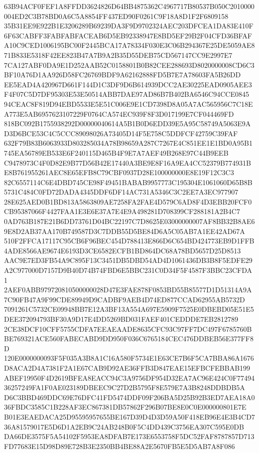 \documentclass[UTF8,fontset=fandol,zihao=-4,a4paper]{ctexart}
\begin{document}
{{63B94ACF0FEF1A8FFDD3624826D64BB4875362C4967717B80537B050C2010000004ED2C3B78BD0A6C5A8854FF437ED90F0261C9F18A8D1F2F6809158
35B31EE9E922B1E3206289B69239DA3F9D9702324AEC203DFCEA1DA83E410F6F63CABFF3FABFABFACEAB6D5EB92338947E8BD5EF29B2F04CFD36BFAF
A10C9CED1006195BC00F2445BCA17A78334F030E3C06B294367E25DE5059AE871B833E5318F42EE823B47A7B9A2B35D55DEB75CD567147CC9E2997E7
7CA127ABF0DA9E1D252AAB52C0158801B0B82CEE288693D8020000008CD6C3BF10A76D1AA926D58FC26769BDF9A62162888FD5B7E7A78603FA5B26DD
EE5EAD4A420967D661F144D1C3DF9D6B614939DCC2AE30225EAD0905AEE3F4F07C5D7DF95303E53E50514ABB7DAE97AD86B7B402BA6546C94CCE0845
94CEAC8F819D94EBD5533E5E51C006E9E1CD7398D8A05A7AC565956C7C18EA773E5AB6957623107229F0764CA574EC939F8F3D017199E7CF044469FD
818BC092B1755938292D00000040614A5B1B0D6EDD39E5A95C58749A5063E9AD3D6BCE53C4C5CCC89098026A73405D14F5E758C5DDFCF42759C39FAF
632F79B83B6063933D803285034A78B98659A287C7267E4C851EE1E1BD0A95B1745EA56789EB533E6F240115D465B4F9E7A7AEF49B268E97C44B9EEB
C9478973C4F0D82E9B77D56B42E17440A3BE9E8F16A9EA4CC52379B774931BE8B761955261AEC8E65EFB8C79CBF0937D28E100000000E8E19F12C3C3
82C6557114C6E4DBD745CE98F49451BABAB9957773C195304E1061060D65B8B5731C484C0FD72DADA4345DDF6DF14AC731A5346C3C2EE7A3EC977907
28E625AED0B1BD813A5863809AE7258FA2FAE4D579C6AD8F4D3EBB20FCF0CB95387066F4427FAA1E3E6E37A7E4E9A498281D708399CF288181A2B4C7
0AD763B187E21B6DD73761D04BC22197C7D8625E03000000007AF8BB32B8AE69E8D2AB37AA170B749587D3C7DDB55D5BE84D6A5C05AB7A1EE42AD67A
510F2FFCA17117C95CB6F96BEC454D788413E866D6C654BD424773EB9D1FFB4ADE8566AE9674E6193D3CE6582ECFB1BD864DC68A78BD5657D25D8513
AAC9E7ED3FB54A9C895F13C3451DB5DBD54AD4D1061436DB3B8F5EDFE29A2C977000D7157D9B40D74B74FBD6E5BBC231C0D34F5F4587F3BBC23CFDA1
2AEF0ABB979720810500000028D47E3FAE878F0853BD55B85577D1D51314A9A7C90FB47A9F99CDE89949D9CADBF9AEB4D74ED877CCAD62955AB5732D
7091261C5732CE09948BB7E12A3BF13A554A697E5909F7525E0DBEBD05E51E5DEE372094793BF30A9D17E4DD5269BD031FAEF401CEDDDE7EB2812789
2CE38DCF10CFF5755CDFA7EEAEAADE8635CFC93C97FF7DC497F6785760BBE769321ACE560FABECABD9DD950F036C6765184CEC476DDBEB56E377FF8D
120E0000000093F5F035A3B8A1C16A580F5734E1E63CE7B6F5CA7BBA86A1676D8ACA2D4A7381F2A1E67CAB9D92AE36FFB3D847EAE15EFBCFEBBAB199
ABEF19950F4D2619BFEA8EACC94C3A9756DF954D32EA7AC96E424C0F7749436257249FA1F0AE023189DBEEC9C27D2B5795F8E579E7A3B8248DDBDB5A
D6C3BBD469DDC69E76DFC41FD5474DDF09F206BA5D25B92B3ED7AEA18A036FBDC3585C1B228AF3EC867381DB57862F296B07BE8E0C0E000000801E7E
B01E3EAEDACA25D95595957655BE167D39D4D3D59A50F418EB96E4E3B4CD736A81579017E5D6D1A2EB9C24AB248B0F5C4DD439C3756EA307C595E0DB
DA66DE3575F5A54102F5953EA8DFAB7E173E6553758F5DC52FAF8787857D713FD77683E15D98D89E728B3E2350BB4BE88A2E5670FB5E5D5AB7A8F086
}}
\end{document}
